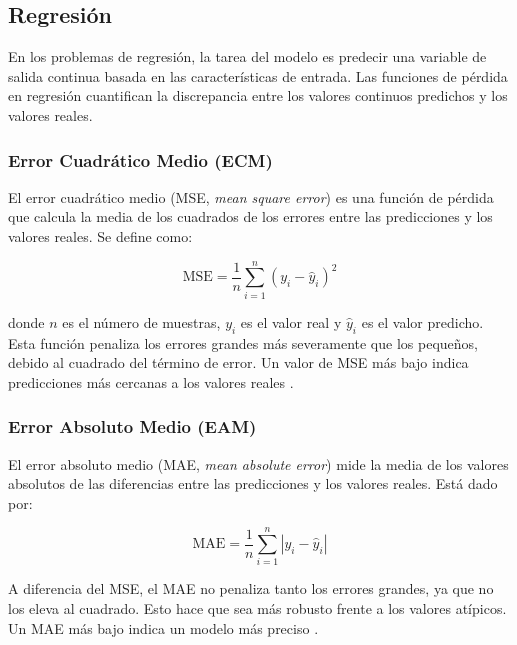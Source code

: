 \subsection{Regresión}

En los problemas de regresión, la tarea del modelo es predecir una variable de salida continua basada en las características de entrada. Las funciones de pérdida en regresión cuantifican la discrepancia entre los valores continuos predichos y los valores reales.

\subsubsection{Error Cuadrático Medio (ECM)}

El error cuadrático medio (MSE, \textit{mean square error}) es una función de pérdida que calcula la media de los cuadrados de los errores entre las predicciones y los valores reales. Se define como:

\begin{equation}
    \text{MSE} = \frac{1}{n} \sum_{i=1}^{n} (y_i - \hat{y}_i)^2
\end{equation}

donde \(n\) es el número de muestras, \(y_i\) es el valor real y \(\hat{y}_i\) es el valor predicho. Esta función penaliza los errores grandes más severamente que los pequeños, debido al cuadrado del término de error. Un valor de MSE más bajo indica predicciones más cercanas a los valores reales \cite{pajares2021aprendizaje}.

\subsubsection{Error Absoluto Medio (EAM)}

El error absoluto medio (MAE, \textit{mean absolute error}) mide la media de los valores absolutos de las diferencias entre las predicciones y los valores reales. Está dado por:

\begin{equation}
    \text{MAE} = \frac{1}{n} \sum_{i=1}^{n} |y_i - \hat{y}_i|
\end{equation}

A diferencia del MSE, el MAE no penaliza tanto los errores grandes, ya que no los eleva al cuadrado. Esto hace que sea más robusto frente a los valores atípicos. Un MAE más bajo indica un modelo más preciso \cite{pajares2021aprendizaje}.

